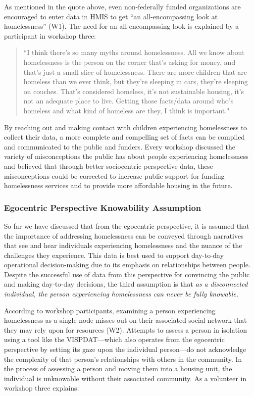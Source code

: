 As mentioned in the quote above, even non-federally funded organizations are encouraged to enter data in HMIS to get ``an all-encompassing look at homelessness'' (W1). The need for an all-encompassing look is explained by a participant in workshop three:

\begin{quote}\singlespacing ``I think there's so many myths around homelessness. All we know about homelessness is the person on the corner that's asking for money, and that's just a small slice of homelessness. There are more children that are homeless than we ever think, but they're sleeping in cars, they're sleeping on couches. That's considered homeless, it's not sustainable housing, it's not an adequate place to live. Getting those facts/data around who's homeless and what kind of homeless are they, I think is important." \end{quote}

By reaching out and making contact with children experiencing homelessness to collect their data, a more complete and compelling set of facts can be compiled and communicated to the public and funders. Every workshop discussed the variety of misconceptions the public has about people experiencing homelessness and believed that through better sociocentric perspective data, these misconceptions could be corrected to increase public support for funding homelessness services and to provide more affordable housing in the future.

\subsubsection{Egocentric Perspective Knowability Assumption}

So far we have discussed that from the egocentric perspective, it is assumed that the importance of addressing homelessness can be conveyed through narratives that see and hear individuals experiencing homelessness and the nuance of the challenges they experience. This data is best used to support day-to-day operational decision-making due to its emphasis on relationships between people. Despite the successful use of data from this perspective for convincing the public and making day-to-day decisions, the third assumption is that \textit{as a disconnected individual, the person experiencing homelessness can never be fully knowable.}

According to workshop participants, examining a person experiencing homelessness as a single node misses out on their associated social network that they may rely upon for resources (W2). Attempts to assess a person in isolation using a tool like the VISPDAT---which also operates from the egocentric perspective by setting its gaze upon the individual person---do not acknowledge the complexity of that person's relationships with others in the community. In the process of assessing a person and moving them into a housing unit, the individual is unknowable without their associated community. As a volunteer in workshop three explains:

